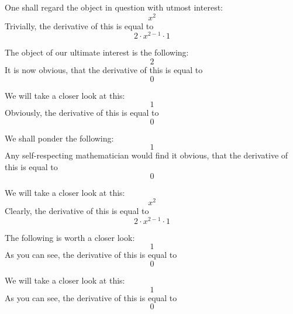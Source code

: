 \documentclass{article}
\begin{document}
One shall regard the object in question with utmost interest:
\begin{equation}
x ^{2 } 
\end{equation}
Trivially, the derivative of this is equal to
\begin{equation}
2 \cdot x ^{2 - 1 } \cdot 1 
\end{equation}

The object of our ultimate interest is the following:
\begin{equation}
2 
\end{equation}
It is now obvious, that the derivative of this is equal to
\begin{equation}
0 
\end{equation}

We will take a closer look at this:
\begin{equation}
1 
\end{equation}
Obviously, the derivative of this is equal to
\begin{equation}
0 
\end{equation}

We shall ponder the following:
\begin{equation}
1 
\end{equation}
Any self-respecting mathematician would find it obvious, that the derivative of this is equal to
\begin{equation}
0 
\end{equation}

We will take a closer look at this:
\begin{equation}
x ^{2 } 
\end{equation}
Clearly, the derivative of this is equal to
\begin{equation}
2 \cdot x ^{2 - 1 } \cdot 1 
\end{equation}

The following is worth a closer look:
\begin{equation}
1 
\end{equation}
As you can see, the derivative of this is equal to
\begin{equation}
0 
\end{equation}

We will take a closer look at this:
\begin{equation}
1 
\end{equation}
As you can see, the derivative of this is equal to
\begin{equation}
0 
\end{equation}
\end{document}
